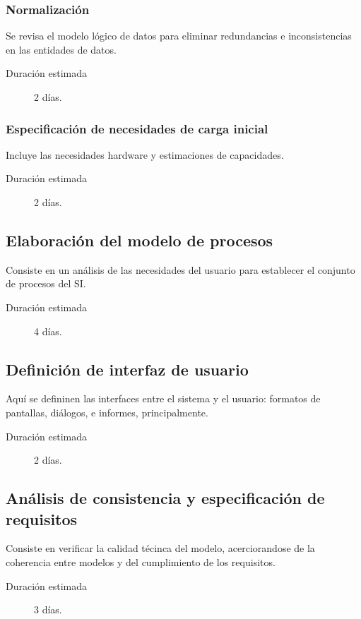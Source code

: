\documentclass[11pt,a4paper,spanish,twoside]{report}
\begin{document}
\subsubsection{Normalización}
Se revisa el modelo lógico de datos para eliminar redundancias e
inconsistencias en las entidades de datos. 
\begin{description}
\item[Duración estimada] 2 días.
\end{description}

\subsubsection{Especificación de necesidades de carga inicial}
Incluye las necesidades hardware y estimaciones de capacidades.
\begin{description}
\item[Duración estimada] 2 días.
\end{description}

\subsection{Elaboración del modelo de procesos}
Consiste en un análisis de las necesidades del usuario para establecer el
conjunto de procesos del SI. 
\begin{description}
\item[Duración estimada] 4 días.
\end{description}

\subsection{Definición de interfaz de usuario}
Aquí se defininen las interfaces entre el sistema y el usuario: formatos de
pantallas, diálogos, e informes, principalmente. 
    \begin{description}
\item[Duración estimada] 2 días.
\end{description}

\subsection{Análisis de consistencia y especificación de requisitos}
Consiste en verificar la calidad técinca del modelo, acerciorandose de la
coherencia entre modelos y del cumplimiento de los requisitos. 
\begin{description}
\item[Duración estimada] 3 días.
\end{description}
\end{document}
